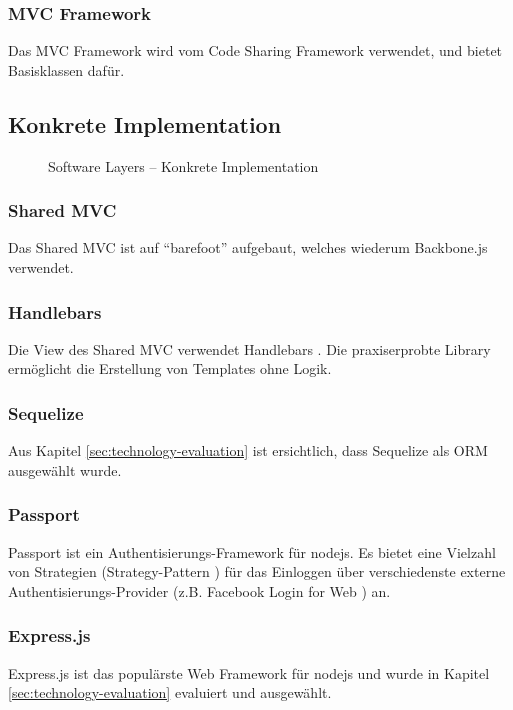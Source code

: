 \subsubsection*{MVC Framework}
Das MVC Framework wird vom Code Sharing Framework verwendet, und bietet Basisklassen dafür.

\subsection*{Konkrete Implementation}

\begin{figure}[H]
	\centering{
		
	}

	\caption{Software Layers -- Konkrete Implementation}
\end{figure}

\subsubsection*{Shared MVC}
Das Shared MVC ist auf ``barefoot'' \cite{Barefoot} aufgebaut, welches wiederum Backbone.js \cite{Backbonejs} verwendet.

\subsubsection*{Handlebars}
Die View des Shared MVC verwendet Handlebars \cite{Handlebars}. Die praxiserprobte Library ermöglicht die Erstellung von Templates ohne Logik.

\subsubsection*{Sequelize}
Aus Kapitel \ref{sec:technology-evaluation}  ist ersichtlich, dass Sequelize \cite{Sequelize} als ORM ausgewählt wurde.

\subsubsection*{Passport}
Passport \cite{Passportjs} ist ein Authentisierungs-Framework für \gls{nodejs}. Es bietet eine Vielzahl von Strategien (Strategy-Pattern \cite{StrategyPattern}) für das Einloggen über verschiedenste externe Authentisierungs-Provider (z.B. Facebook Login for Web \cite{facebooklogin}) an.

\subsubsection*{Express.js}
Express.js \cite{Expressjs} ist das populärste Web Framework für \gls{nodejs} und wurde in Kapitel \ref{sec:technology-evaluation}  evaluiert und ausgewählt.


